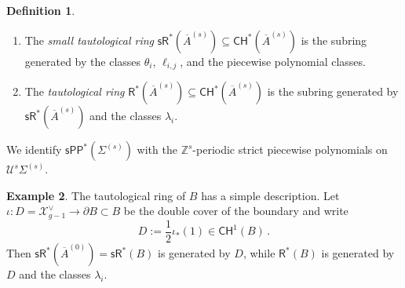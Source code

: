 \documentclass[11pt]{article}
\def\CH{\mathsf{CH}}
\def\R{\mathsf{R}}
\def\X{\mathcal{X}}
\def\ZZ{\mathbb{Z}}
\def\sR{\mathsf{sR}}
\newcommand{\barA}{\overline{A}}
\newcommand{\sPP}{\mathsf{sPP}}
\newcommand{\spp}{\sPP}
\theoremstyle{definition}
\newtheorem{definition}{Definition}[section]
\newtheorem{example}[definition]{Example}
\begin{document}
\begin{definition}
    \begin{enumerate}[label = (\alph*)]
        \item The {\em small tautological ring} $\sR^*(\barA^{(s)}) \subseteq \CH^*(\barA^{(s)})$ is the subring generated by the classes $\theta_i$, $\ell_{i,j}$, and the piecewise polynomial classes.

        \item The {\em tautological ring} $\R^*(\barA^{(s)}) \subseteq \CH^*(\barA^{(s)})$ is the subring generated by $\sR^*(\barA^{(s)})$ and the classes $\lambda_i$.
    \end{enumerate}
\end{definition}

We identify $\spp^{\ast}(\Sigma^{(s)})$ with the $\ZZ^{s}$-periodic strict piecewise polynomials on $\mathcal U^{s}\Sigma^{(s)}$.

\begin{example}
	The tautological ring of $B$ has a simple description. Let $\iota : D = \X_{g-1}^\vee \to \partial B \subset B$ be the double cover
	of the boundary and write
	\[
		D := \frac{1}{2}\iota_*(1) \in \CH^1(B)\,.
	\]
	Then $\sR^*(\barA^{(0)}) = \sR^*(B)$ is generated by $D$, while $\R^*(B)$ is generated by $D$ and the classes $\lambda_i$.
\end{example}
\end{document}
